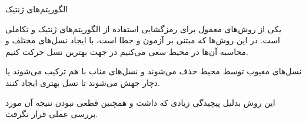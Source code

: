 \SubProblem
{الگوریتم‌های ژنتیک}
{
یکی از روش‌های معمول برای رمزگشایی استفاده از الگوریتم‌های ژنتیک و تکاملی است.
در این روش‌ها که مبتنی بر آزمون و خطا است، با ایجاد نسل‌های
مختلف و محاسبه
آن‌ها در محیط سعی می‌کنیم در جهت بهترین نسل حرکت کنیم.

نسل‌های معیوب توسط محیط حذف می‌شوند و نسل‌های مناب با هم ترکیب می‌شوند یا دچار جهش
می‌شوند تا نسل بهتری ایجاد کنند.

این روش بدلیل پیچیدگی زیادی که داشت و همچنین قطعی نبودن نتیجه آن مورد بررسی عملی قرار نگرفت.
}
